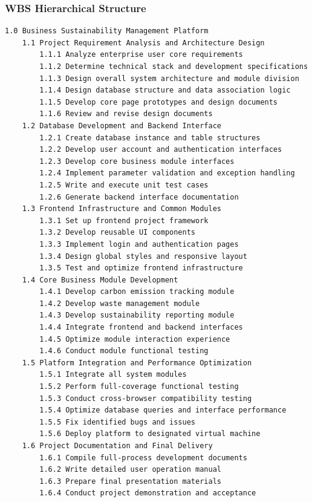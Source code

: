 \documentclass[12pt,a4paper]{article}
\begin{document}
\subsubsection{WBS Hierarchical Structure}
\begin{verbatim}
1.0 Business Sustainability Management Platform
    1.1 Project Requirement Analysis and Architecture Design
        1.1.1 Analyze enterprise user core requirements
        1.1.2 Determine technical stack and development specifications
        1.1.3 Design overall system architecture and module division
        1.1.4 Design database structure and data association logic
        1.1.5 Develop core page prototypes and design documents
        1.1.6 Review and revise design documents
    1.2 Database Development and Backend Interface
        1.2.1 Create database instance and table structures
        1.2.2 Develop user account and authentication interfaces
        1.2.3 Develop core business module interfaces
        1.2.4 Implement parameter validation and exception handling
        1.2.5 Write and execute unit test cases
        1.2.6 Generate backend interface documentation
    1.3 Frontend Infrastructure and Common Modules
        1.3.1 Set up frontend project framework
        1.3.2 Develop reusable UI components
        1.3.3 Implement login and authentication pages
        1.3.4 Design global styles and responsive layout
        1.3.5 Test and optimize frontend infrastructure
    1.4 Core Business Module Development
        1.4.1 Develop carbon emission tracking module
        1.4.2 Develop waste management module
        1.4.3 Develop sustainability reporting module
        1.4.4 Integrate frontend and backend interfaces
        1.4.5 Optimize module interaction experience
        1.4.6 Conduct module functional testing
    1.5 Platform Integration and Performance Optimization
        1.5.1 Integrate all system modules
        1.5.2 Perform full-coverage functional testing
        1.5.3 Conduct cross-browser compatibility testing
        1.5.4 Optimize database queries and interface performance
        1.5.5 Fix identified bugs and issues
        1.5.6 Deploy platform to designated virtual machine
    1.6 Project Documentation and Final Delivery
        1.6.1 Compile full-process development documents
        1.6.2 Write detailed user operation manual
        1.6.3 Prepare final presentation materials
        1.6.4 Conduct project demonstration and acceptance
\end{verbatim}
\end{document}
